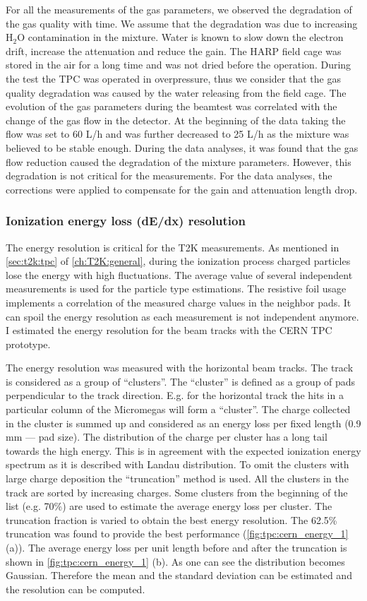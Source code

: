 \documentclass[../main.tex]{subfiles}
\begin{document}
For all the measurements of the gas parameters, we observed the degradation of the gas quality with time. We assume that the degradation was due to increasing $\text{H}_2\text{O}$ contamination in the mixture. Water is known to slow down the electron drift, increase the attenuation and reduce the gain. The HARP field cage was stored in the air for a long time and was not dried before the operation. During the test the TPC was operated in overpressure, thus we consider that the gas quality degradation was caused by the water releasing from the field cage. The evolution of the gas parameters during the beamtest was correlated with the change of the gas flow in the detector. At the beginning of the data taking the flow was set to 60 L/h and was further decreased to 25 L/h as the mixture was believed to be stable enough. During the data analyses, it was found that the gas flow reduction caused the degradation of the mixture parameters. However, this degradation is not critical for the measurements. For the data analyses, the corrections were applied to compensate for the gain and attenuation length drop.

\subsubsection{Ionization energy loss (dE/dx) resolution}
\label{sec:tpc:tpc_dedx}
The energy resolution is critical for the T2K measurements. As mentioned in \autoref{sec:t2k:tpc} of \autoref{ch:T2K:general}, during the ionization process charged particles lose the energy with high fluctuations. The average value of several independent measurements is used for the particle type estimations. The resistive foil usage implements a correlation of the measured charge values in the neighbor pads. It can spoil the energy resolution as each measurement is not independent anymore. I estimated the energy resolution for the beam tracks with the CERN TPC prototype.

The energy resolution was measured with the horizontal beam tracks. The track is considered as a group of ``clusters''. The ``cluster'' is defined as a group of pads perpendicular to the track direction. E.g. for the horizontal track the hits in a particular column of the Micromegas will form a ``cluster''. The charge collected in the cluster is summed up and considered as an energy loss per fixed length (0.9 mm --- pad size). The distribution of the charge per cluster has a long tail towards the high energy. This is in agreement with the expected ionization energy spectrum as it is described with Landau distribution. To omit the clusters with large charge deposition the ``truncation'' method is used. All the clusters in the track are sorted by increasing charges. Some clusters from the beginning of the list (e.g. 70\%) are used to estimate the average energy loss per cluster. The truncation fraction is varied to obtain the best energy resolution. The 62.5\% truncation was found to provide the best performance (\autoref{fig:tpc:cern_energy_1} (a)). The average energy loss per unit length before and after the truncation is shown in \autoref{fig:tpc:cern_energy_1} (b). As one can see the distribution becomes Gaussian. Therefore the mean and the standard deviation can be estimated and the resolution can be computed.
\end{document}
